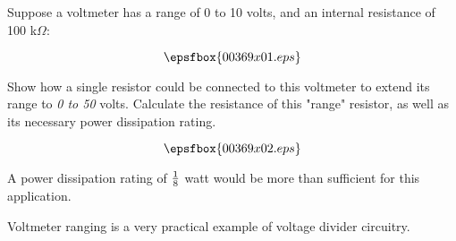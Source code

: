 

Suppose a voltmeter has a range of 0 to 10 volts, and an internal resistance of 100 k$\Omega$:

$$\epsfbox{00369x01.eps}$$

Show how a single resistor could be connected to this voltmeter to extend its range to {\it 0 to 50} volts.  Calculate the resistance of this "range" resistor, as well as its necessary power dissipation rating.







$$\epsfbox{00369x02.eps}$$

A power dissipation rating of ${1 \over 8}$ watt would be more than sufficient for this application.







Voltmeter ranging is a very practical example of voltage divider circuitry.




